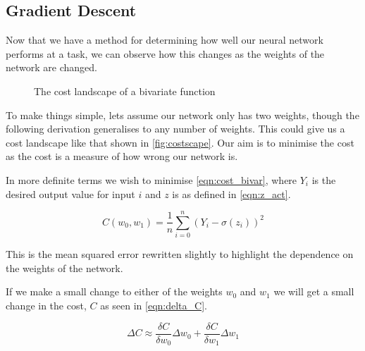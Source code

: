\subsection{Gradient Descent}
Now that we have a method for determining how well our neural network performs at a task, we can observe how this changes as the weights of the network are changed.


\begin{figure}
\begin{center}
\caption{The cost landscape of a bivariate function}
\label{fig:costscape}
\end{center}
\end{figure}

To make things simple, lets assume our network only has two weights, though the following derivation generalises to any number of weights. This could give us a cost landscape like that shown in \autoref{fig:costscape}. Our aim is to minimise the cost as the cost is a measure of how wrong our network is.

In more definite terms we wish to minimise \autoref{eqn:cost_bivar}, where $Y_i$ is the desired output value for input $i$ and $z$ is as defined in \autoref{eqn:z_act}.

\begin{equation} \label{eqn:cost_bivar}
C(w_0, w_1) = \frac{1}{n}\sum_{i=0}^{n} (Y_i - \sigma(z_i))^2
\end{equation}

This is the mean squared error rewritten slightly to highlight the dependence on the weights of the network.

If we make a small change to either of the weights $w_0$ and $w_1$ we will get a small change in the cost, $C$ as seen in \autoref{eqn:delta_C}.

\begin{equation} \label{eqn:delta_C}
\Delta C \approx \frac{\delta C}{\delta w_0} \Delta w_0 + \frac{\delta C}{\delta w_1} \Delta w_1
\end{equation}

